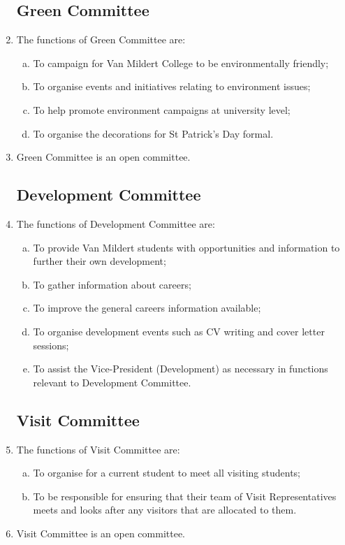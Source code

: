 \documentclass[12pt]{article}  %
\begin{document}
\begin{enumerate}
    \subsection{Green Committee}
    \item The functions of Green Committee are:
    \begin{enumerate}[(a)]
        \item To campaign for Van Mildert College to be environmentally friendly;
        \item To organise events and initiatives relating to environment issues;
        \item To help promote environment campaigns at university level;
        \item To organise the decorations for St Patrick’s Day formal.
    \end{enumerate}
    \item Green Committee is an open committee.
    \subsection{Development Committee}
    \item The functions of Development Committee are:
    \begin{enumerate}[(a)]
        \item To provide Van Mildert students with opportunities and information to further their own development;
        \item To gather information about careers;
        \item To improve the general careers information available;
        \item To organise development events such as CV writing and cover letter sessions;
        \item To assist the Vice-President (Development) as necessary in functions relevant to Development Committee.
    \end{enumerate}
    \subsection{Visit Committee}
    \item The functions of Visit Committee are:
    \begin{enumerate}[(a)]
        \item To organise for a current student to meet all visiting students;
        \item To be responsible for ensuring that their team of Visit Representatives meets and looks after any visitors that are allocated to them.
    \end{enumerate}
    \item Visit Committee is an open committee.

\end{enumerate}
\end{document}
